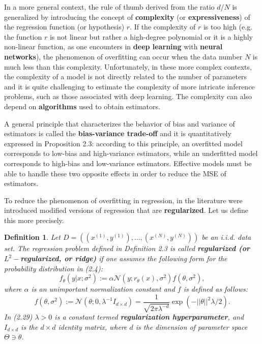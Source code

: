 \documentclass{report}
\newtheorem{definition}{Definition}[chapter]
\begin{document}
In a more general context, the rule of thumb derived from the ratio $d/N$ is generalized by introducing the concept of \textbf{complexity} (or \textbf{expressiveness}) of the regression function (or hypothesis) $r$. If the complexity of $r$ is too high (e.g. the function $r$ is not linear but rather a high-degree polynomial or it is a highly non-linear function, as one encounters in \textbf{deep learning} with \textbf{neural networks}), the phenomenon of overfitting can occur when the data number $N$ is much less than this complexity. Unfortunately, in these more complex contexts, the complexity of a model is not directly related to the number of parameters and it is quite challenging to estimate the complexity of more intricate inference problems, such as those associated with deep learning. The complexity can also depend on \textbf{algorithms} used to obtain estimators.

A general principle that characterizes the behavior of bias and variance of estimators is called the \textbf{bias-variance trade-off} and it is quantitatively expressed in Proposition 2.3: according to this principle, an overfitted model corresponds to low-bias and high-variance estimators, while an underfitted model corresponds to high-bias and low-variance estimators. Effective models must be able to handle these two opposite effects in order to reduce the MSE of estimators.

To reduce the phenomenon of overfitting in regression, in the literature were introduced modified versions of regression that are \textbf{regularized}. Let us define this more precisely.

\begin{definition}
Let $D = ((x^{(1)},y^{(1)}),\dots,(x^{(N)},y^{(N)}))$ be an i.i.d. data set. The regression problem defined in Definition 2.3 is called \textbf{regularized (or $L^2-$regularized, or ridge)} if one assumes the following form for the probability distribution in (2.4): 
\begin{equation}
f_\theta(y|x;\sigma^2) := \alpha\mathcal{N}(y;r_\theta(x),\sigma^2)f(\theta, \sigma^2),
\end{equation}
where $\alpha$ is an unimportant normalization constant and $f$ is defined as follows:
\begin{equation}
f(\theta,\sigma^2) := \mathcal{N}(\theta;0,\lambda^{-1}I_{d\times d}) = \frac{1}{\sqrt{2\pi\lambda^{-d}}}\exp(-||\theta||^2\lambda / 2).
\end{equation}
In (2.29) $\lambda > 0$ is a constant termed \textbf{regularization hyperparameter}, and $I_{d\times d}$ is the $d\times d$ identity matrix, where $d$ is the  dimension of parameter space $\Theta \ni \theta$.
\end{definition}
\end{document}
